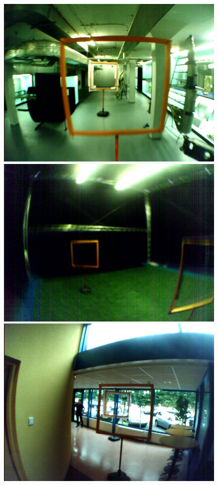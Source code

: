 \begin{figure}
	\centering
	\begin{minipage}{0.3\textwidth}
		\includegraphics[width=\textwidth]{fig/basement}
	\end{minipage}\hfill
	\begin{minipage}{0.3\textwidth}
	\includegraphics[width=\textwidth]{fig/cyberzoo}
\end{minipage}\hfill
	\begin{minipage}{0.3\textwidth}
	\includegraphics[width=\textwidth]{fig/hallway}

\end{minipage}
\end{figure}
